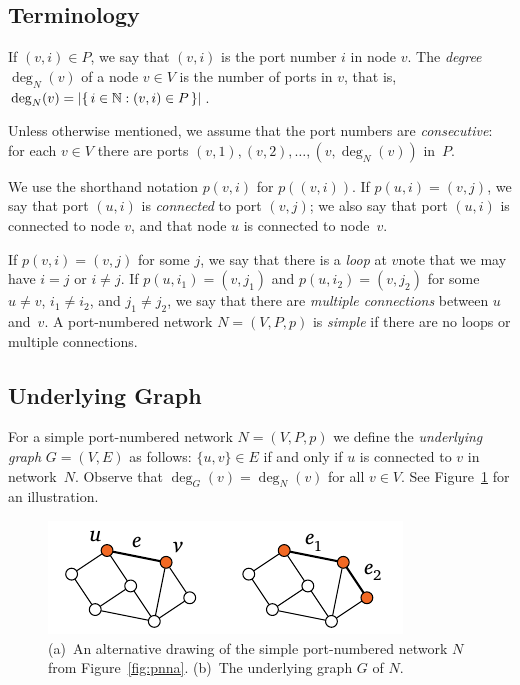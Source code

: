 \subsection{Terminology}

If $(v,i) \in P$, we say that $(v,i)$ is the port number $i$ in node $v$. The \emph{degree} $\deg_N(v)$ of a node $v \in V$ is the number of ports in $v$, that is, $\deg_N(v) = |\{\,  i \in \mathbb{N} : (v,i) \in P  \,\}|$.

Unless otherwise mentioned, we assume that the port numbers are \emph{consecutive}: for each $v \in V$ there are ports $(v,1),\allowbreak (v,2),\allowbreak \dotsc,\allowbreak (v,\deg_N(v))$ in~$P$.

We use the shorthand notation $p(v,i)$ for $p((v,i))$. If $p(u,i) = (v,j)$, we say that port $(u,i)$ is \emph{connected} to port $(v,j)$; we also say that port $(u,i)$ is connected to node $v$, and that node $u$ is connected to node~$v$.

If $p(v,i) = (v,j)$ for some $j$, we say that there is a \emph{loop} at $v$\mydash note that we may have $i = j$ or $i \ne j$. If $p(u,i_1) = (v,j_1)$ and $p(u,i_2) = (v,j_2)$ for some $u \ne v$, $i_1 \ne i_2$, and $j_1 \ne j_2$, we say that there are \emph{multiple connections} between $u$ and~$v$. A port-numbered network $N = (V,P,p)$ is \emph{simple} if there are no loops or multiple connections. 

\subsection{Underlying Graph}

For a simple port-numbered network $N = (V,P,p)$ we define the \emph{underlying graph} $G = (V,E)$ as follows: $\{u,v\} \in E$ if and only if $u$ is connected to $v$ in network~$N$. Observe that $\deg_G(v) = \deg_N(v)$ for all $v \in V$. See Figure~\ref{fig:pnnc} for an illustration.
\begin{figure}
    \centering
    \includegraphics[page=\PPnnC]{figs.pdf}
    \caption{(a)~An alternative drawing of the simple port-numbered network $N$ from Figure~\ref{fig:pnna}. (b)~The underlying graph $G$ of $N$.}\label{fig:pnnc}
\end{figure}

